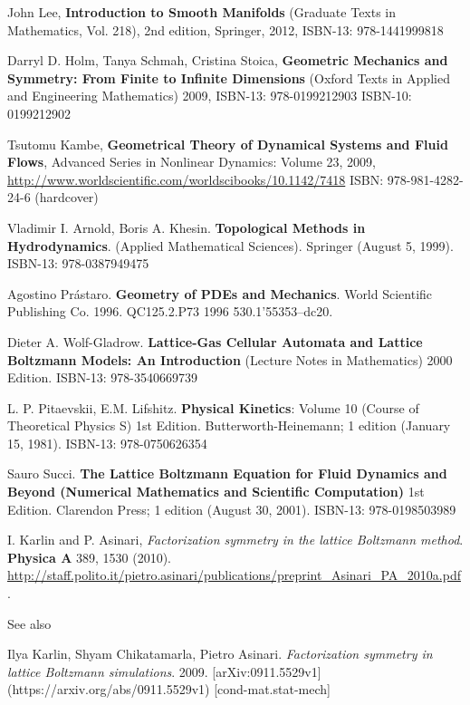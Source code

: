 \documentclass[twoside,landscape,10pt]{amsart}
\theoremstyle{plain}
\theoremstyle{definition}
\theoremstyle{remark}
\theoremstyle{remark}
\begin{document}
\begin{thebibliography}{9}
John Lee, \textbf{Introduction to Smooth Manifolds} (Graduate Texts in Mathematics, Vol. 218), 2nd edition, Springer,  2012, ISBN-13: 978-1441999818


Darryl D. Holm, Tanya Schmah, Cristina Stoica, \textbf{Geometric Mechanics and Symmetry: From Finite to Infinite Dimensions} (Oxford Texts in Applied and Engineering Mathematics) 2009,  ISBN-13: 978-0199212903  ISBN-10: 0199212902  

Tsutomu Kambe, \textbf{Geometrical Theory of Dynamical Systems and Fluid Flows}, Advanced Series in Nonlinear Dynamics: Volume 23, 2009, \url{http://www.worldscientific.com/worldscibooks/10.1142/7418} ISBN: 978-981-4282-24-6 (hardcover)

Vladimir I. Arnold, Boris A. Khesin.  \textbf{Topological Methods in Hydrodynamics}. (Applied Mathematical Sciences).  Springer (August 5, 1999).  ISBN-13: 978-0387949475

Agostino Pr\'{a}staro.  \textbf{Geometry of PDEs and Mechanics}.  World Scientific Publishing Co.  1996.  QC125.2.P73 1996  530.1'55353--dc20.  

Dieter A. Wolf-Gladrow.  \textbf{Lattice-Gas Cellular Automata and Lattice Boltzmann Models: An Introduction} (Lecture Notes in Mathematics) 2000 Edition.  ISBN-13: 978-3540669739


L. P. Pitaevskii, E.M. Lifshitz. \textbf{Physical Kinetics}: Volume 10 (Course of Theoretical Physics S) 1st Edition.  Butterworth-Heinemann; 1 edition (January 15, 1981).  ISBN-13: 978-0750626354

 Sauro Succi.  \textbf{The Lattice Boltzmann Equation for Fluid Dynamics and Beyond (Numerical Mathematics and Scientific Computation)} 1st Edition.  Clarendon Press; 1 edition (August 30, 2001).  ISBN-13: 978-0198503989



I. Karlin and P. Asinari, \emph{Factorization symmetry in the lattice Boltzmann method}.  \textbf{Physica A} 389, 1530 (2010).  \url{http://staff.polito.it/pietro.asinari/publications/preprint_Asinari_PA_2010a.pdf}.  

See also

Ilya Karlin, Shyam Chikatamarla, Pietro Asinari. \emph{Factorization symmetry in lattice Boltzmann simulations}.  2009.  [arXiv:0911.5529v1](https://arxiv.org/abs/0911.5529v1) [cond-mat.stat-mech] 


\end{thebibliography}
\end{document}
